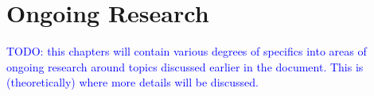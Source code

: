 \chapter{Ongoing Research}

\textcolor{blue}{TODO: this chapters will contain various degrees of specifics into areas of ongoing research around topics discussed earlier in the document. This is (theoretically) where more details will be discussed.}